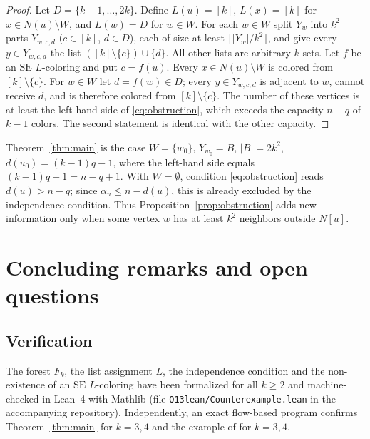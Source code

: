 \documentclass[11pt]{article}
\theoremstyle{definition}
\newcommand{\SE}{\mathrm{SE}}
\begin{document}
\begin{proof}
Let $D=\{k+1,\dots,2k\}$. Define $L(u)=[k]$, $L(x)=[k]$ for $x\in N(u)\setminus W$, and
$L(w)=D$ for $w\in W$. For each $w\in W$ split $Y_w$ into $k^2$ parts
$Y_{w,c,d}$ ($c\in[k]$, $d\in D$), each of size at least $\lfloor |Y_w|/k^2\rfloor$, and
give every $y\in Y_{w,c,d}$ the list $([k]\setminus\{c\})\cup\{d\}$. All other lists are
arbitrary $k$-sets. Let $f$ be an $\SE$ $L$-coloring and put $c=f(u)$. Every
$x\in N(u)\setminus W$ is colored from $[k]\setminus\{c\}$. For $w\in W$ let $d=f(w)\in D$;
every $y\in Y_{w,c,d}$ is adjacent to $w$, cannot receive $d$, and is therefore colored
from $[k]\setminus\{c\}$. The number of these vertices is at least the left-hand side of
\eqref{eq:obstruction}, which exceeds the capacity $n-q$ of $k-1$ colors. The second
statement is identical with the other capacity.
\end{proof}

Theorem~\ref{thm:main} is the case $W=\{w_0\}$, $Y_{w_0}=B$, $|B|=2k^2$,
$d(u_0)=(k-1)q-1$, where the left-hand side equals $(k-1)q+1=n-q+1$.
With $W=\emptyset$, condition \eqref{eq:obstruction} reads $d(u)>n-q$; since
$\alpha_u\le n-d(u)$, this is already excluded by the independence condition. Thus
Proposition~\ref{prop:obstruction} adds new information only when some vertex $w$ has at
least $k^2$ neighbors outside $N[u]$.

\section{Concluding remarks and open questions}\label{sec:open}

\subsection*{Verification}
The forest $F_k$, the list assignment $L$, the independence condition and the
non-existence of an $\SE$ $L$-coloring have been formalized for all $k\ge 2$ and
machine-checked in Lean~4 with Mathlib (file \texttt{Q13lean/Counterexample.lean} in the
accompanying repository). Independently, an exact flow-based program confirms
Theorem~\ref{thm:main} for $k=3,4$ and the example of \cite{KMW} for $k=3,4$.
\end{document}
